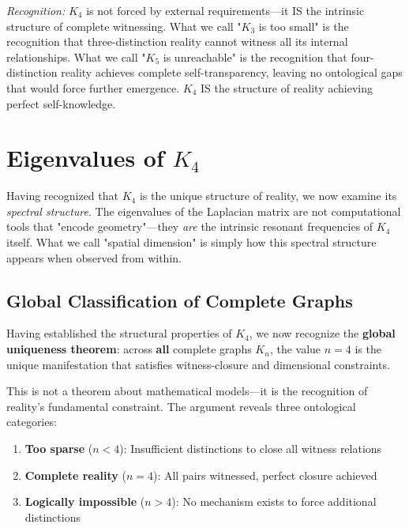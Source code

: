 \documentclass[11pt,a4paper]{book}
\begin{document}
\medskip
\noindent\textit{Recognition:} $K_4$ is not forced by external requirements—it IS the intrinsic structure of complete witnessing. What we call "$K_3$ is too small" is the recognition that three-distinction reality cannot witness all its internal relationships. What we call "$K_5$ is unreachable" is the recognition that four-distinction reality achieves complete self-transparency, leaving no ontological gaps that would force further emergence. $K_4$ IS the structure of reality achieving perfect self-knowledge.


\chapter{Eigenvalues of $K_4$}
\label{chap:spectral-theory}

Having recognized that $K_4$ is the unique structure of reality, we now examine its \emph{spectral structure}. 
The eigenvalues of the Laplacian matrix are not computational tools that "encode geometry"—they \emph{are} 
the intrinsic resonant frequencies of $K_4$ itself. What we call "spatial dimension" is simply how this 
spectral structure appears when observed from within.

\section{Global Classification of Complete Graphs}
\label{sec:global-classification}

Having established the structural properties of $K_4$, we now recognize the \textbf{global uniqueness theorem}: across \textbf{all} complete graphs $K_n$, the value $n = 4$ is the unique manifestation that satisfies witness-closure and dimensional constraints.

This is not a theorem about mathematical models—it is the recognition of reality's fundamental constraint. The argument reveals three ontological categories:
\begin{enumerate}
\item \textbf{Too sparse} ($n < 4$): Insufficient distinctions to close all witness relations
\item \textbf{Complete reality} ($n = 4$): All pairs witnessed, perfect closure achieved
\item \textbf{Logically impossible} ($n > 4$): No mechanism exists to force additional distinctions
\end{enumerate}
\end{document}
